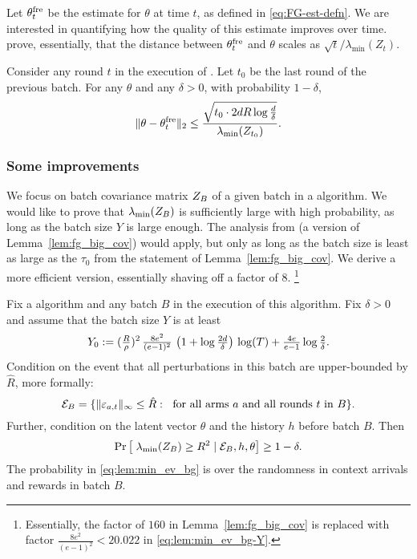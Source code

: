 Let $\theta_{t}^{\textrm{fre}}$ be the \FreqGreedy estimate for $\theta$ at time $t$, as defined in \eqref{eq:FG-est-defn}. We are interested in quantifying how the quality of this estimate improves over time. \citet{kannan2018smoothed} prove, essentially, that the distance between $\theta_{t}^{\textrm{fre}}$ and $\theta$ scales as
    $\sqrt{t}/\lambda_{\min}(Z_t)$.
\begin{lemma}
Consider any round $t$ in the execution of \FreqGreedy. Let $t_0$ be the last round of the previous batch. For any $\theta$ and any $\delta>0$, with probability $1-\delta$,
  \[
    \|\theta - \theta_{t}^{\textrm{fre}}\|_2 \le
    \frac{\sqrt{t_0 \cdot 2dR \log \tfrac{d}{\delta}}}{\lambda_{\min}(Z_{t_0})}.
  \]
  \label{lem:fmt_close}
\end{lemma}

\subsubsection{Some improvements}

We focus on batch covariance matrix $Z_B$ of a given batch in a \GreedyStyle algorithm. We would like to prove that $\lambda_{\min}(Z_B)$ is sufficiently large with high probability, as long as the batch size $Y$ is large enough. The analysis from \citet{kannan2018smoothed} (a version of Lemma~\ref{lem:fg_big_cov}) would apply, but only as long as the batch size is least as large as the $\tau_0$ from the statement of Lemma~\ref{lem:fg_big_cov}. We derive a more efficient version, essentially shaving off a factor of $8$.%
\footnote{Essentially, the factor of $160$ in Lemma~\ref{lem:fg_big_cov} is replaced with factor $\tfrac{8e^2}{(e-1)^2}<20.022$ in \eqref{eq:lem:min_ev_bg-Y}.}

\begin{lemma}
Fix a \GreedyStyle algorithm and any batch $B$ in the execution of this algorithm.  Fix $\delta>0$ and assume that the batch size $Y$ is at least
\begin{align}\label{eq:lem:min_ev_bg-Y}
    Y_0 :=  (\tfrac{R}{\rho})^2 \,
            \tfrac{8e^2}{(e-1)^2}\,
            \left(1 + \log \tfrac{2d}{\delta}\right)\, \log(T)
    + \tfrac{4e}{e-1} \log \tfrac{2}{\delta}.
\end{align}
Condition on the event that all perturbations in this batch are upper-bounded by $\hat R$, more formally:
\[ \mathcal{E}_B = \{ \|\varepsilon_{a,t}\|_\infty \leq \hat R:\;
    \text{ for all arms $a$ and all rounds $t$ in $B$} \}. \]
Further, condition on the latent vector $\theta$ and the history $h$ before batch $B$. Then
\begin{align}\label{eq:lem:min_ev_bg}
    \Pr\left[\;  \lambda_{\min}(Z_B) \ge R^2 \;|\; \mathcal{E}_B,h,\theta \right] \geq 1-\delta.
\end{align}
The probability in \eqref{eq:lem:min_ev_bg} is over the randomness in context arrivals and rewards in batch $B$.
  \label{lem:min_ev_bg}
\end{lemma}

